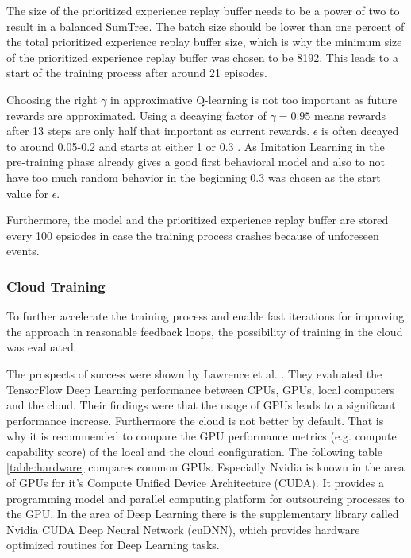 The size of the prioritized experience replay buffer needs to be a power of two to result in a balanced SumTree. The batch size should be lower than one percent of the total prioritized experience replay buffer size, which is why the minimum size of the prioritized experience replay buffer was chosen to be 8192. This leads to a start of the training process after around 21 episodes. 

Choosing the right $\gamma$ in approximative Q-learning is not too important as future rewards are approximated. Using a decaying factor of $\gamma=0.95$ means rewards after 13 steps are only half that important as current rewards. $\epsilon$ is often decayed to around 0.05-0.2 and starts at either 1 or 0.3 \cite{Hessel2017, Kormelink2018, Franca2019}. As Imitation Learning in the pre-training phase already gives a good first behavioral model and also to not have too much random behavior in the beginning 0.3 was chosen as the start value for $\epsilon$. 

Furthermore, the model and the  prioritized experience replay buffer are stored every 100 epsiodes in case the training process crashes because of unforeseen events. 

\subsubsection{Cloud Training}
\label{ch:approachBf}

To further accelerate the training process and enable fast iterations for im\-pro\-ving the approach in reasonable feedback loops, the possibility of training in the cloud was evaluated. 

The prospects of success were shown by Lawrence et al. \cite{Lawrence2017ComparingTD}. They evaluated the TensorFlow Deep Learning performance between CPUs, GPUs, local computers and the cloud. Their findings were that the usage of GPUs leads to a significant performance increase. Furthermore the cloud is not better by default. That is why it is recommended to compare the GPU performance metrics (e.g. compute capability score) of the local and the cloud configuration. The following table \ref{table:hardware} compares common GPUs.
Especially Nvidia is known in the area of GPUs for it's Compute Unified Device Ar\-chi\-tec\-tu\-re (CUDA). It provides a programming model and parallel computing platform for outsourcing processes to the GPU. In the area of Deep Learning there is the supplementary library called Nvidia CUDA Deep Neural Network (cuDNN), which provides hardware optimized routines for Deep Learning tasks.

